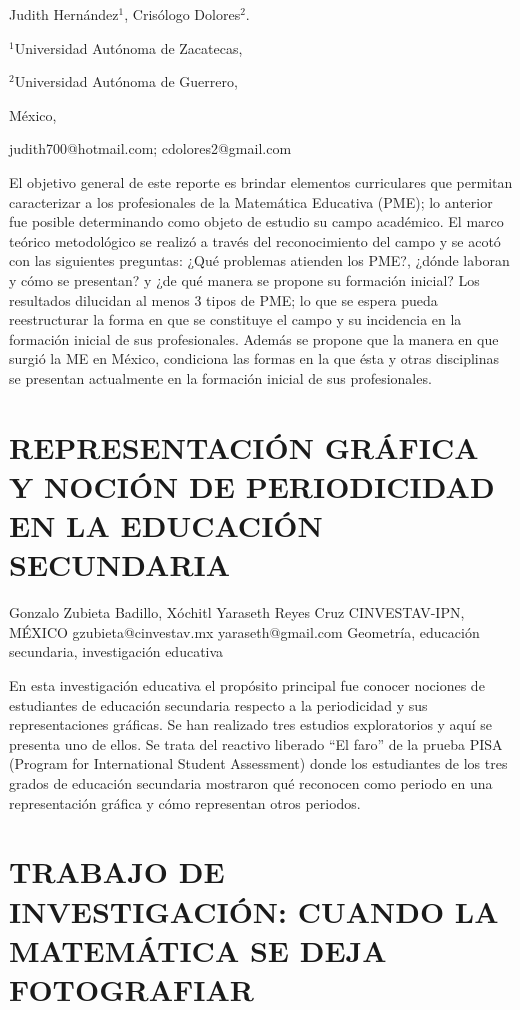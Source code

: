 \begin{datos}

Judith Hernández$^{1}$, Crisólogo Dolores$^{2}$.

$^{1}$Universidad Autónoma de Zacatecas,

$^{2}$Universidad Autónoma de Guerrero,

México,

judith700@hotmail.com; cdolores2@gmail.com

\end{datos}

El objetivo general de este reporte es brindar elementos curriculares
que permitan caracterizar a los profesionales de la Matemática Educativa
(PME); lo anterior fue posible determinando como objeto de estudio
su campo académico. El marco teórico metodológico se realizó a través
del reconocimiento del campo y se acotó con las siguientes preguntas:
¿Qué problemas atienden los PME?, ¿dónde laboran y cómo se presentan?
y ¿de qué manera se propone su formación inicial? Los resultados dilucidan
al menos 3 tipos de PME; lo que se espera pueda reestructurar la forma
en que se constituye el campo y su incidencia en la formación inicial
de sus profesionales. Además se propone que la manera en que surgió
la ME en México, condiciona las formas en la que ésta y otras disciplinas
se presentan actualmente en la formación inicial de sus profesionales.


\section{REPRESENTACIÓN GRÁFICA Y NOCIÓN DE PERIODICIDAD EN LA EDUCACIÓN SECUNDARIA}

Gonzalo Zubieta Badillo, Xóchitl Yaraseth Reyes Cruz CINVESTAV-IPN,
MÉXICO gzubieta@cinvestav.mx yaraseth@gmail.com Geometría, educación
secundaria, investigación educativa

En esta investigación educativa el propósito principal fue conocer
nociones de estudiantes de educación secundaria respecto a la periodicidad
y sus representaciones gráficas. Se han realizado tres estudios exploratorios
y aquí se presenta uno de ellos. Se trata del reactivo liberado “El
faro” de la prueba PISA (Program for International Student Assessment)
donde los estudiantes de los tres grados de educación secundaria mostraron
qué reconocen como periodo en una representación gráfica y cómo representan
otros periodos.


\section{TRABAJO DE INVESTIGACIÓN: CUANDO LA MATEMÁTICA SE DEJA FOTOGRAFIAR}

